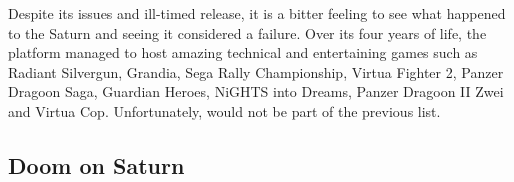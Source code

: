 Despite its issues and ill-timed release, it is a bitter feeling to see what happened to the Saturn and seeing it considered a failure. Over its four years of life, the platform managed to host amazing technical and entertaining games such as Radiant Silvergun, Grandia, Sega Rally Championship, Virtua Fighter 2, Panzer Dragoon Saga, Guardian Heroes, NiGHTS into Dreams, Panzer Dragoon II Zwei and Virtua Cop. Unfortunately, \doom{} would not be part of the previous list.\\
\par
{}




























\subsection{Doom on Saturn}

